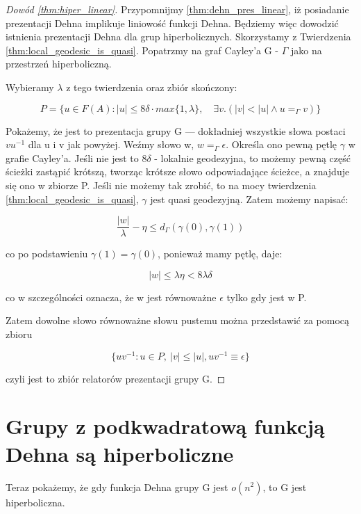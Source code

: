 \documentclass[licencjacka]{pracamgr}
\begin{document}
\begin{proof}[Dowód \ref{thm:hiper_linear}]

Przypomnijmy \ref{thm:dehn_pres_linear}, iż posiadanie prezentacji Dehna implikuje liniowość funkcji Dehna. Będziemy więc dowodzić istnienia prezentacji Dehna dla grup hiperbolicznych. Skorzystamy z Twierdzenia \ref{thm:local_geodesic_is_quasi}. Popatrzmy na graf Cayley'a G - $\Gamma$ jako na przestrzeń hiperboliczną.

Wybieramy $\lambda$ z tego twierdzenia oraz zbiór skończony:

\[ P = \{u \in F(A) : |u| \leq 8 \delta \cdot  max \{1, \lambda \}, \quad \exists v. (|v| < |u| \land u =_{\Gamma} v)  \} \]



Pokażemy, że jest to prezentacja grupy G — dokładniej wszystkie słowa postaci $vu^{-1}$ dla u i v jak powyżej. Weźmy słowo w, $w =_{\Gamma} \epsilon$. Określa ono pewną pętlę $\gamma$ w grafie Cayley'a. Jeśli nie jest to $8 \delta$ - lokalnie geodezyjna, to możemy pewną część ścieżki zastąpić krótszą, tworząc krótsze słowo odpowiadające ścieżce, a znajduje się ono w zbiorze P. Jeśli nie możemy tak zrobić, to na mocy twierdzenia \ref{thm:local_geodesic_is_quasi}, $\gamma$ jest quasi geodezyjną. Zatem możemy napisać:

\[ \frac{|w|}{\lambda} - \eta \leq d_{\Gamma}(\gamma(0), \gamma(1)) \]

\noindent
co po podstawieniu $\gamma(1) = \gamma(0)$, ponieważ mamy pętlę, daje:

\[ |w| \leq \lambda \eta < 8 \lambda \delta \]

\noindent
co w szczególności oznacza, że w jest równoważne $\epsilon$ tylko gdy jest w P.

Zatem dowolne słowo równoważne słowu pustemu można przedstawić za pomocą zbioru  

\[ \{ uv^{-1} : u \in P, \ |v| \leq |u|, uv^{-1} \equiv \epsilon \} \]

\noindent
czyli jest to zbiór relatorów prezentacji grupy G.

\end{proof}

\section{Grupy z podkwadratową funkcją Dehna są hiperboliczne}

Teraz pokażemy, że gdy funkcja Dehna grupy G jest $o(n^2)$, to G jest hiperboliczna.
\end{document}
